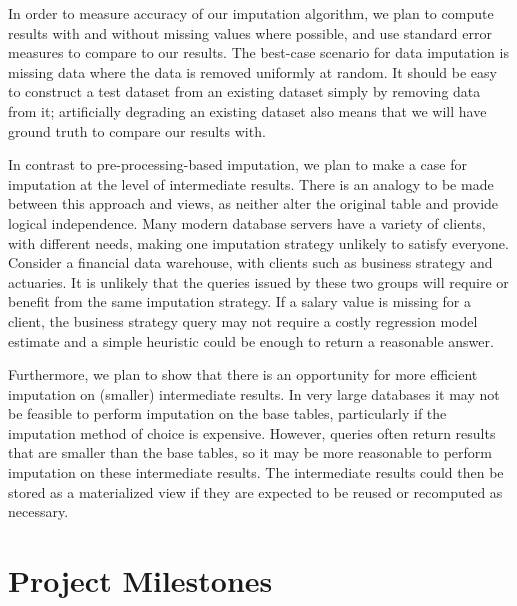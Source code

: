 \documentclass{article}
\begin{document}
In order to measure accuracy of our imputation algorithm, we plan to compute results with and without missing values where possible, and use standard error measures to compare to our results. The best-case scenario for data imputation is missing data where the data is removed uniformly at random. It should be easy to construct a test dataset from an existing dataset simply by removing data from it; artificially degrading an existing dataset also means that we will have ground truth to compare our results with.

In contrast to pre-processing-based imputation, we plan to make a case for imputation at the level of intermediate results. There is an analogy to be made between this approach and views, as neither alter the original table and provide logical independence. Many modern database servers have a variety of clients, with different needs, making one imputation strategy unlikely to satisfy everyone. Consider a financial data warehouse, with clients such as business strategy and actuaries. It is unlikely that the queries issued by these two groups will require or benefit from the same imputation strategy. If a salary value is missing for a client, the business strategy query may not require a costly regression model estimate and a simple heuristic could be enough to return a reasonable answer. 

Furthermore, we plan to show that there is an opportunity for more efficient imputation on (smaller) intermediate results. In very large databases it may not be feasible to perform imputation on the base tables, particularly if the imputation method of choice is expensive. However, queries often return results that are smaller than the base tables, so it may be more reasonable to perform imputation on these intermediate results. The intermediate results could then be stored as a materialized view if they are expected to be reused or recomputed as necessary.

\section{Project Milestones}
\end{document}
